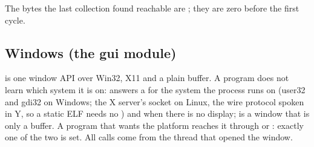 \noindent The bytes the last collection found reachable are ; they are
zero before the first cycle.

\subsection{Windows (the gui module)}
\label{sec:builtin-gui}

 is one window API over Win32, X11 and a plain buffer. A
program does not learn which system it is on:  answers
a  for the system the process runs on (user32 and gdi32 on
Windows; the X server's socket on Linux, the wire protocol spoken in Y, so a
static ELF needs no ) and  when there is no display;
 is a window that is only a buffer. A program that
wants the platform reaches it through  or
: exactly one of the two is set. All calls come from the thread
that opened the window.

